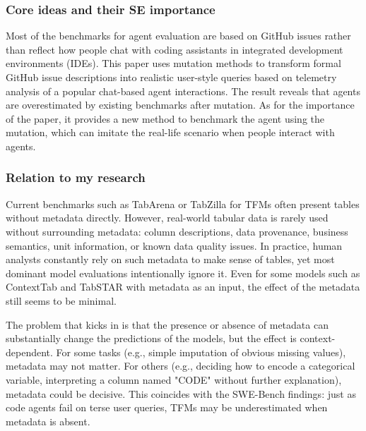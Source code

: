 \documentclass[11pt]{article}
\begin{document}
\subsubsection{Core ideas and their SE importance}
Most of the benchmarks for agent evaluation are based on GitHub issues rather than reflect how people chat with coding assistants in integrated development environments (IDEs).
This paper uses mutation methods to transform formal GitHub issue descriptions into realistic user-style queries based on telemetry analysis of a popular chat-based agent interactions\cite{garg2025saving}. The result reveals that agents are overestimated by existing benchmarks after mutation. As for the importance of the paper, it provides a new method to benchmark the agent using the mutation, which can imitate the real-life scenario when people interact with agents. 

\subsubsection{Relation to my research}

Current benchmarks such as TabArena\cite{erickson2026tabarena} or TabZilla\cite{mcelfresh2023neural} for TFMs often present tables without metadata directly. However, real-world tabular data is rarely used without surrounding metadata: column descriptions, data provenance, business semantics, unit information, or known data quality issues. In practice, human analysts constantly rely on such metadata to make sense of tables, yet most dominant model evaluations intentionally ignore it. Even for some models such as ContextTab\cite{spinaci2026contexttab} and TabSTAR\cite{arazi2026tabstar} with metadata as an input, the effect of the metadata still seems to be minimal. 

The problem that kicks in is that the presence or absence of metadata can substantially change the predictions of the models, but the effect is context-dependent. For some tasks (e.g., simple imputation of obvious missing values), metadata may not matter. For others (e.g., deciding how to encode a categorical variable, interpreting a column named "CODE" without further explanation), metadata could be decisive. This coincides with the SWE-Bench findings: just as code agents fail on terse user queries, TFMs may be underestimated when metadata is absent. 
\end{document}

